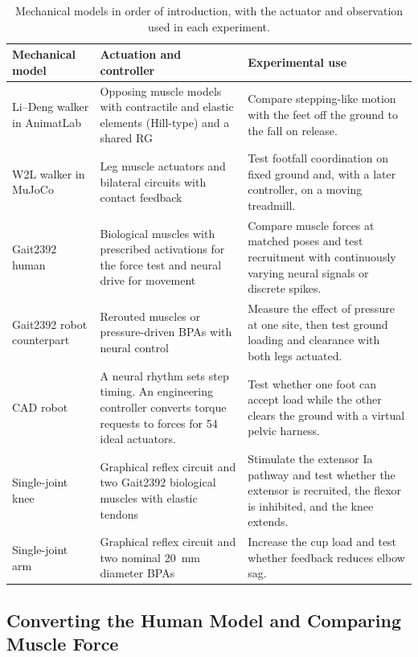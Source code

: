 \begin{table}[!htbp]
\centering\small
\caption[Mechanical models and actuators]{Mechanical models in order of introduction, with the actuator and observation used in each experiment.}
\label{tab:sns_model_configurations}
\begin{tabularx}{\textwidth}{@{}>{\raggedright\arraybackslash}p{}>{\raggedright\arraybackslash}p{}>{\raggedright\arraybackslash}X@{}}
\toprule
Mechanical model & Actuation and controller & Experimental use \\
\midrule
Li--Deng walker in AnimatLab & Opposing muscle models with contractile and elastic elements (Hill-type) and a shared RG & Compare stepping-like motion with the feet off the ground to the fall on release. \\
W2L walker in MuJoCo & Leg muscle actuators and bilateral circuits with contact feedback & Test footfall coordination on fixed ground and, with a later controller, on a moving treadmill. \\
Gait2392 human & Biological muscles with prescribed activations for the force test and neural drive for movement & Compare muscle forces at matched poses and test recruitment with continuously varying neural signals or discrete spikes. \\
Gait2392 robot counterpart & Rerouted muscles or pressure-driven BPAs with neural control & Measure the effect of pressure at one site, then test ground loading and clearance with both legs actuated. \\
CAD robot & A neural rhythm sets step timing. An engineering controller converts torque requests to forces for 54 ideal actuators. & Test whether one foot can accept load while the other clears the ground with a virtual pelvic harness. \\
Single-joint knee & Graphical reflex circuit and two Gait2392 biological muscles with elastic tendons & Stimulate the extensor Ia pathway and test whether the extensor is recruited, the flexor is inhibited, and the knee extends. \\
Single-joint arm & Graphical reflex circuit and two nominal \qty{20}{\milli\meter} diameter BPAs & Increase the cup load and test whether feedback reduces elbow sag. \\
\bottomrule
\end{tabularx}
\end{table}

\subsection{Converting the Human Model and Comparing Muscle Force}

